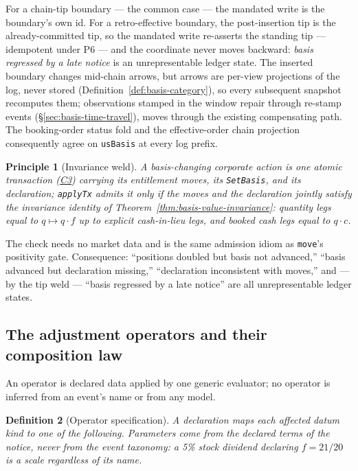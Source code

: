 \documentclass[11pt,a4paper]{article}
\newtheorem{definition}{Definition}[section]
\newtheorem{principle}[definition]{Principle}
\begin{document}
For a chain-tip boundary --- the common case --- the mandated write is the boundary's own
id. For a retro-effective boundary, the post-insertion tip is the
already-committed tip, so the mandated write re-asserts the standing tip --- idempotent
under P6 --- and the coordinate never moves backward: \emph{basis regressed by a late
notice} is an unrepresentable ledger state. The inserted boundary changes mid-chain
arrows, but arrows are per-view projections of the log, never stored
(Definition~\ref{def:basis-category}), so every subsequent snapshot recomputes them;
observations stamped in the window repair through re-stamp events
(\S\ref{sec:basis-time-travel}), moves through the existing compensating path. The
booking-order status fold and the effective-order chain projection consequently agree on
\texttt{usBasis} at every log prefix.

\begin{principle}[Invariance weld]
\label{prin:invariance-weld}
A basis-changing corporate action is one atomic transaction
(\hyperref[cond:C3]{C3}) carrying its entitlement moves, its \texttt{SetBasis}, and its
declaration; \texttt{applyTx} admits it only if the moves and the declaration jointly
satisfy the invariance identity of Theorem~\ref{thm:basis-value-invariance}: quantity
legs equal to $q\mapsto q\cdot f$ up to explicit cash-in-lieu legs, and booked cash legs
equal to $q\cdot c$.
\end{principle}

The check needs no market data and is the same admission idiom as \texttt{move}'s
positivity gate. Consequence: ``positions doubled but basis not advanced,'' ``basis
advanced but declaration missing,'' ``declaration inconsistent with moves,'' and --- by
the tip weld --- ``basis regressed by a late notice'' are all unrepresentable ledger
states.

\subsection{The adjustment operators and their composition law}
\label{sec:basis-operators}

An operator is declared data applied by one generic evaluator; no operator is inferred
from an event's name or from any model.

\begin{definition}[Operator specification]
\label{def:opspec}
A declaration maps each affected datum kind to one of the following. Parameters come
from the declared terms of the notice, never from the event taxonomy: a 5\% stock
dividend declaring $f=21/20$ is a scale regardless of its name.
\end{definition}
\end{document}
